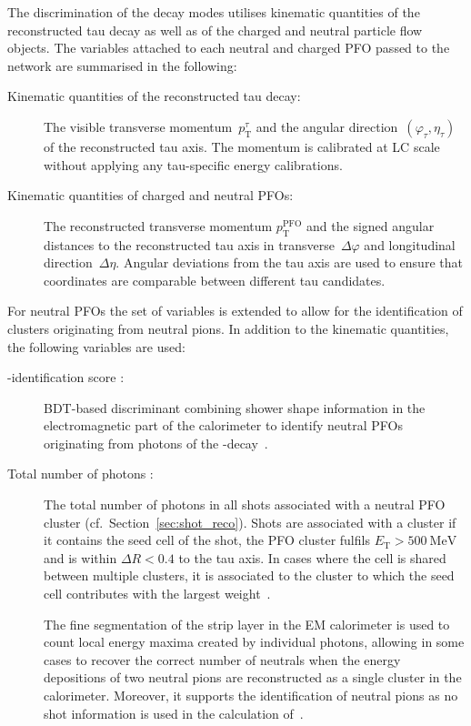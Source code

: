 The discrimination of the decay modes utilises kinematic quantities of the
reconstructed tau decay as well as of the charged and neutral particle flow
objects. The variables attached to each neutral and charged PFO passed to the
network are summarised in the following:
\begin{description}
\item[Kinematic quantities of the reconstructed tau decay:] The visible
  transverse momentum~$p_\text{T}^\tau$ and the angular
  direction~$(\varphi_\tau, \eta_\tau)$ of the reconstructed tau axis. The
  momentum is calibrated at LC scale without applying any tau-specific energy
  calibrations.

\item[Kinematic quantities of charged and neutral PFOs:] The reconstructed
  transverse momentum $p_\text{T}^\text{PFO}$ and the signed angular distances
  to the reconstructed tau axis in transverse~$\Delta\varphi$ and longitudinal
  direction~$\Delta\eta$. Angular deviations from the tau axis are used to
  ensure that coordinates are comparable between different tau candidates.
\end{description}
For neutral PFOs the set of variables is extended to allow for the
identification of clusters originating from neutral pions. In addition to the
kinematic quantities, the following variables are used:
\begin{description}
\item[-identification score :]
  BDT-based discriminant combining shower shape information in the
  electromagnetic part of the calorimeter to identify neutral PFOs originating
  from photons of the -decay~\cite{atlas:taurec:decaymodes}.

\item[Total number of photons :] The total
  number of photons in all shots associated with a neutral PFO cluster (cf.\
  Section~\ref{sec:shot_reco}). Shots are associated with a cluster if it
  contains the seed cell of the shot, the PFO cluster fulfils
  $E_\text{T} > \SI{500}{\mega\electronvolt}$ and is within $\Delta R < 0.4$ to
  the tau axis. In cases where the cell is shared between multiple clusters, it
  is associated to the cluster to which the seed cell contributes with the
  largest weight~\cite{athena}.

  The fine segmentation of the strip layer in the EM calorimeter is used to
  count local energy maxima created by individual photons, allowing in some
  cases to recover the correct number of neutrals when the energy depositions of
  two neutral pions are reconstructed as a single cluster in the calorimeter.
  Moreover, it supports the identification of neutral pions as no shot
  information is used in the calculation of~.
\end{description}

